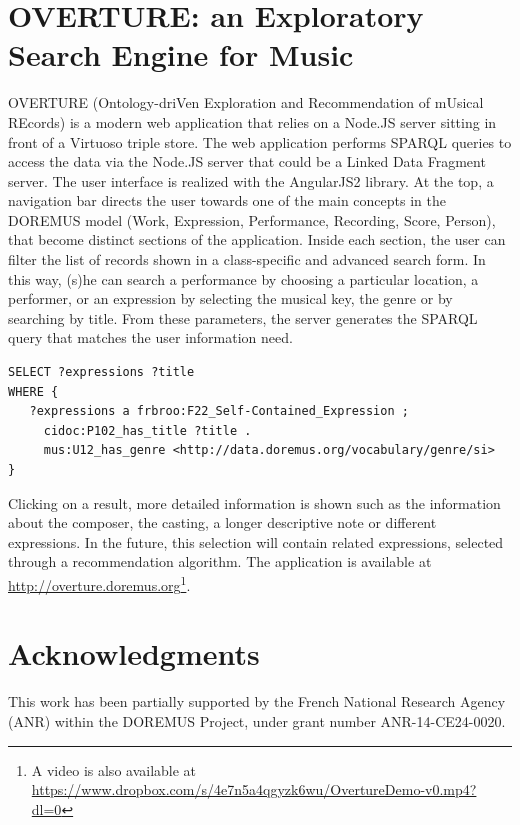 \documentclass[runningheads,a4paper]{llncs}
\begin{document}

\section{OVERTURE: an Exploratory Search Engine for Music}
\label{sec:overture}

OVERTURE (Ontology-driVen Exploration and Recommendation of mUsical REcords) is a modern web application that relies on a Node.JS server sitting in front of a Virtuoso triple store. The web application performs SPARQL queries to access the data via the Node.JS server that could be a Linked Data Fragment server. The user interface is realized with the AngularJS2 library. At the top, a navigation bar directs the user towards one of the main concepts in the DOREMUS model (Work, Expression, Performance, Recording, Score, Person), that become distinct sections of the application. Inside each section, the user can filter the list of records shown in a class-specific and advanced search form. In this way, (s)he can search a performance by choosing a particular location, a performer, or an expression by selecting the musical key, the genre or by searching by title. From these parameters, the server generates the SPARQL query that matches the user information need.

\begin{verbatim}
SELECT ?expressions ?title
WHERE {
   ?expressions a frbroo:F22_Self-Contained_Expression ;
     cidoc:P102_has_title ?title .
     mus:U12_has_genre <http://data.doremus.org/vocabulary/genre/si>
}
\end{verbatim}

Clicking on a result, more detailed information is shown such as the information about the composer, the casting, a longer descriptive note or different expressions. In the future, this selection will contain related expressions, selected through a recommendation algorithm. The application is available at \url{http://overture.doremus.org}\footnote{A video is also available at \url{https://www.dropbox.com/s/4e7n5a4qgyzk6wu/OvertureDemo-v0.mp4?dl=0}}.

\section*{Acknowledgments}
This work has been partially supported by the French National Research Agency (ANR) within the DOREMUS Project, under grant number ANR-14-CE24-0020.



\end{document}
